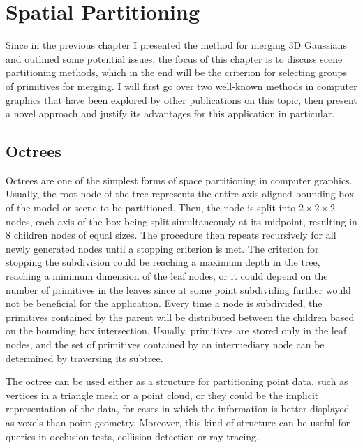 \section{Spatial Partitioning}
Since in the previous chapter I presented the method for merging 3D Gaussians and outlined some potential issues, the focus of this chapter is to discuss scene partitioning methods, which in the end will be the criterion for selecting groups of primitives for merging. I will first go over two well-known methods in computer graphics that have been explored by other publications on this topic, then present a novel approach and justify its advantages for this application in particular. 

\subsection{Octrees}
Octrees are one of the simplest forms of space partitioning in computer graphics. Usually, the root node of the tree represents the entire axis-aligned bounding box of the model or scene to be partitioned. Then, the node is split into $2 \times 2 \times 2$ nodes, each axis of the box being split simultaneously at its midpoint, resulting in 8 children nodes of equal sizes. The procedure then repeats recursively for all newly generated nodes until a stopping criterion is met. The criterion for stopping the subdivision could be reaching a maximum depth in the tree, reaching a minimum dimension of the leaf nodes, or it could depend on the number of primitives in the leaves since at some point subdividing further would not be beneficial for the application. Every time a node is subdivided, the primitives contained by the parent will be distributed between the children based on the bounding box intersection. Usually, primitives are stored only in the leaf nodes, and the set of primitives contained by an intermediary node can be determined by traversing its subtree. 

The octree can be used either as a structure for partitioning point data, such as vertices in a triangle mesh or a point cloud, or they could be the implicit representation of the data, for cases in which the information is better displayed as voxels than point geometry. Moreover, this kind of structure can be useful for queries in occlusion tests, collision detection or ray tracing.

